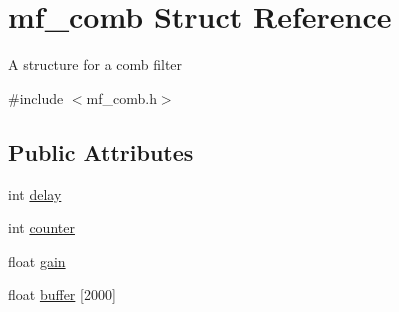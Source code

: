 \hypertarget{structmf__comb}{}\section{mf\+\_\+comb Struct Reference}
\label{structmf__comb}


A structure for a comb filter ~\newline
  




{\ttfamily \#include $<$mf\+\_\+comb.\+h$>$}

\subsection*{Public Attributes}
\begin{DoxyCompactItemize}
\item 
int \mbox{\hyperlink{structmf__comb_a7d1902007eda85c94aab30d2d4c5607a}{delay}}
\item 
int \mbox{\hyperlink{structmf__comb_ab7a1f487fb56b06ee98393dec50c36ee}{counter}}
\item 
float \mbox{\hyperlink{structmf__comb_a395f06c6d6486d3408b4fc1a45f0ed4b}{gain}}
\item 
float \mbox{\hyperlink{structmf__comb_a0fc2e7d60244597a0b9c221dea042cca}{buffer}} \mbox{[}2000\mbox{]}
\end{DoxyCompactItemize}
